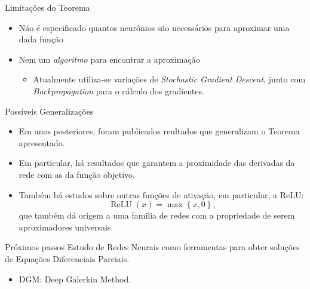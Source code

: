 \documentclass[13pt]{beamer}
\begin{document}

\begin{frame}{Limitações do Teorema}
    \begin{itemize}
        \item<1-> Não é especificado quantos neurônios são necessários para aproximar uma dada função
        \item<2-> Nem um \emph{algoritmo} para encontrar a aproximação
            \begin{itemize}
                \item<3-> Atualmente utiliza-se variações de \emph{Stochastic Gradient Descent}, junto com \emph{Backpropagation} para o cálculo dos gradientes.
            \end{itemize}
    \end{itemize}
\end{frame}


\begin{frame}{Possíveis Generalizações}
    \begin{itemize}
        \item<1-> Em anos posteriores, foram publicados reultados que generalizam o Teorema apresentado.
        \item<2-> Em particular, há resultados que garantem a proximidade das derivadas da rede com as da função objetivo.
        \item<3-> Também há estudos sobre outras funções de ativação, em particular, a ReLU:
            \begin{equation*}
                \operatorname{ReLU} ( x ) = \max \left\{ x, 0 \right\}
            ,\end{equation*}
            que também dá origem a uma família de redes com a propriedade de serem aproximadores universais.
    \end{itemize}
\end{frame}


\begin{frame}{Próximos passos}
    Estudo de Redes Neurais como ferramentas para obter soluções de Equações Diferenciais Parciais.
    \begin{itemize}
        \item<2-> DGM: Deep Galerkin Method.
    \end{itemize}
\end{frame}
\end{document}
